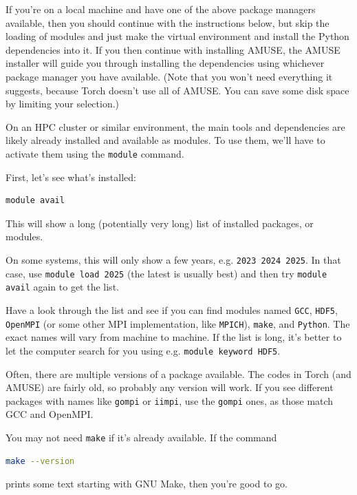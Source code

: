 \documentclass[10pt]{article}
\begin{document}
If you're on a local machine and have one of the above package managers available, then
you should continue with the instructions below, but skip the loading of modules and
just make the virtual environment and install the Python dependencies into it. If you
then continue with installing AMUSE, the AMUSE installer will guide you through
installing the dependencies using whichever package manager you have available. (Note
that you won't need everything it suggests, because Torch doesn't use all of AMUSE. You
can save some disk space by limiting your selection.)

On an HPC cluster or similar environment, the main tools and dependencies are likely
already installed and available as modules. To use them, we'll have to activate them
using the \texttt{module} command.

First, let's see what's installed:

\begin{lstlisting}[language=bash]
module avail
\end{lstlisting}

This will show a long (potentially very long) list of installed packages, or modules.

On some systems, this will only show a few years, e.g. \texttt{2023 2024 2025}. In that
case, use \texttt{module load 2025} (the latest is usually best) and then try
\texttt{module avail} again to get the list.

Have a look through the list and see if you can find modules named \texttt{GCC},
\texttt{HDF5}, \texttt{OpenMPI} (or some other MPI implementation, like \texttt{MPICH}),
\texttt{make}, and \texttt{Python}. The exact names will vary from
machine to machine. If the list is long, it's better to let the computer search for you
using e.g. \texttt{module keyword HDF5}.

Often, there are multiple versions of a package available. The codes in Torch (and
AMUSE) are fairly old, so probably any version will work. If you see different packages
with names like \texttt{gompi} or \texttt{iimpi}, use the \texttt{gompi} ones, as those
match GCC and OpenMPI.

You may not need \texttt{make} if it's already available. If the command

\begin{lstlisting}[language=bash]
make --version
\end{lstlisting}

prints some text starting with GNU Make, then you're good to go.
\end{document}
